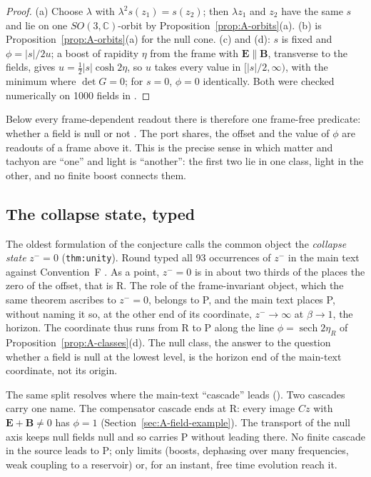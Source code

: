 \begin{proof}
(a) Choose $\lambda$ with $\lambda^2s(z_1)=s(z_2)$; then $\lambda z_1$ and $z_2$ have the same $s$ and lie on
one $SO(3,\mathbb C)$-orbit by Proposition~\ref{prop:A-orbits}(a). (b) is Proposition~\ref{prop:A-orbits}(a)
for the null cone. (c) and (d): $s$ is fixed and $\phi=|s|/2u$; a boost of rapidity $\eta$ from the frame with
$\mathbf E\parallel\mathbf B$, transverse to the fields, gives $u=\tfrac12|s|\cosh2\eta$, so $u$ takes every value
in $[|s|/2,\infty)$, with the minimum where $\det G=0$; for $s=0$,
$\phi=0$ identically. Both were checked numerically on 1000 fields in .
\end{proof}

Below every frame-dependent readout there is therefore one frame-free predicate: whether a field is
null or not \Established. The port shares, the offset and the value of $\phi$ are readouts of a
frame above it. This is the precise sense in which matter and tachyon are ``one'' and light is
``another'': the first two lie in one class, light in the other, and no finite boost connects them.

\subsection{The collapse state, typed}
\label{sec:A-collapse}

The oldest formulation of the conjecture calls the common object the \emph{collapse state}
$z^-=0$ (\texttt{thm:unity}). Round  typed all 93 occurrences of $z^-$ in the main text against
Convention~F \Reading. As a point, $z^-=0$ is in about two thirds of the places the zero of the offset,
that is R. The role of the frame-invariant object, which the same theorem ascribes to $z^-=0$, belongs to
P, and the main text places P, without naming it so, at the other end of its coordinate, $z^-\to\infty$
at $\beta\to1$, the horizon. The coordinate thus runs from R to P along the line
$\phi=\operatorname{sech}2\eta_R$ of Proposition~\ref{prop:A-classes}(d). The null class, the answer to
the question whether a field is null at the lowest level, is the horizon end of the main-text coordinate,
not its origin.

The same split resolves where the main-text ``cascade'' leads (). Two cascades carry one name.
The compensator cascade ends at R: every image $Cz$ with $\mathbf E+\mathbf B\neq0$ has $\phi=1$
(Section~\ref{sec:A-field-example}). The transport of the null axis keeps null fields null and so carries
P without leading there. No finite cascade in the source leads to P; only limits (boosts, dephasing over
many frequencies, weak coupling to a reservoir) or, for an instant, free time evolution reach it.

